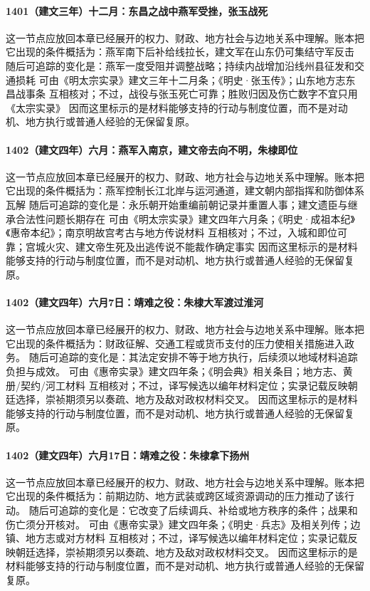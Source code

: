 \paragraph{1401（建文三年）十二月：东昌之战中燕军受挫，张玉战死} 这一节点应放回本章已经展开的权力、财政、地方社会与边地关系中理解。账本把它出现的条件概括为：燕军南下后补给线拉长，建文军在山东仍可集结守军反击 随后可追踪的变化是：燕军一度受阻并调整战略；持续内战增加沿线州县征发和交通损耗 可由《明太宗实录》建文三年十二月条；《明史·张玉传》；山东地方志东昌战事条 互相核对；不过，战役与张玉死亡可靠；胜败归因及伤亡数字不宜只用《太宗实录》 因而这里标示的是材料能够支持的行动与制度位置，而不是对动机、地方执行或普通人经验的无保留复原。

\paragraph{1402（建文四年）六月：燕军入南京，建文帝去向不明，朱棣即位} 这一节点应放回本章已经展开的权力、财政、地方社会与边地关系中理解。账本把它出现的条件概括为：燕军控制长江北岸与运河通道，建文朝内部指挥和防御体系瓦解 随后可追踪的变化是：永乐朝开始重编前朝记录并重置人事；建文遗臣与继承合法性问题长期存在 可由《明太宗实录》建文四年六月条；《明史·成祖本纪》《惠帝本纪》；南京明故宫考古与地方传说材料 互相核对；不过，入城和即位可靠；宫城火灾、建文帝生死及出逃传说不能裁作确定事实 因而这里标示的是材料能够支持的行动与制度位置，而不是对动机、地方执行或普通人经验的无保留复原。

\paragraph{1402（建文四年）六月7日：靖难之役：朱棣大军渡过淮河} 这一节点应放回本章已经展开的权力、财政、地方社会与边地关系中理解。账本把它出现的条件概括为：财政征解、交通工程或货币支付的压力使相关措施进入政务。 随后可追踪的变化是：其法定安排不等于地方执行，后续须以地域材料追踪负担与成效。 可由《惠帝实录》建文四年条；《明会典》相关条目；地方志、黄册/契约/河工材料 互相核对；不过，译写候选以编年材料定位；实录记载反映朝廷选择，崇祯期须另以奏疏、地方及敌对政权材料交叉。 因而这里标示的是材料能够支持的行动与制度位置，而不是对动机、地方执行或普通人经验的无保留复原。

\paragraph{1402（建文四年）六月17日：靖难之役：朱棣拿下扬州} 这一节点应放回本章已经展开的权力、财政、地方社会与边地关系中理解。账本把它出现的条件概括为：前期边防、地方武装或跨区域资源调动的压力推动了该行动。 随后可追踪的变化是：它改变了后续调兵、补给或地方秩序的条件；战果和伤亡须分开核对。 可由《惠帝实录》建文四年条；《明史·兵志》及相关列传；边镇、地方志或对方材料 互相核对；不过，译写候选以编年材料定位；实录记载反映朝廷选择，崇祯期须另以奏疏、地方及敌对政权材料交叉。 因而这里标示的是材料能够支持的行动与制度位置，而不是对动机、地方执行或普通人经验的无保留复原。

